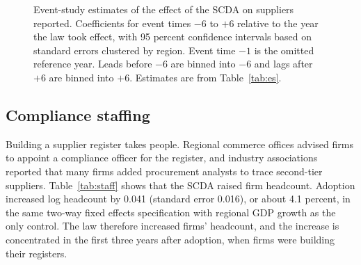 \documentclass[11pt]{article}
\begin{document}
\begin{figure}[ht]
\centering
{}
\caption{Event-study estimates of the effect of the SCDA on suppliers reported. Coefficients for event times $-6$ to $+6$ relative to the year the law took effect, with 95 percent confidence intervals based on standard errors clustered by region. Event time $-1$ is the omitted reference year. Leads before $-6$ are binned into $-6$ and lags after $+6$ are binned into $+6$. Estimates are from Table~\ref{tab:es}.}
\label{fig:es}
\end{figure}

\subsection{Compliance staffing}

Building a supplier register takes people. Regional commerce offices advised firms to appoint a compliance officer for the register, and industry associations reported that many firms added procurement analysts to trace second-tier suppliers. Table~\ref{tab:staff} shows that the SCDA raised firm headcount. Adoption increased log headcount by 0.041 (standard error 0.016), or about 4.1 percent, in the same two-way fixed effects specification with regional GDP growth as the only control. The law therefore increased firms' headcount, and the increase is concentrated in the first three years after adoption, when firms were building their registers.
\end{document}
